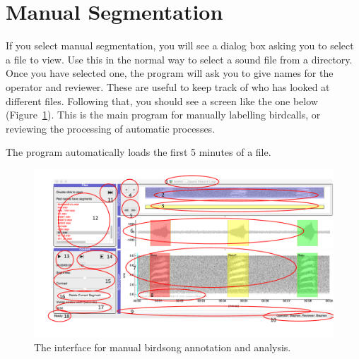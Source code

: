 \documentclass{article}
\begin{document}
\section{Manual Segmentation}
\label{sec:manual}

If you select manual segmentation, you will see a dialog box asking you to select a file to view. Use this in the normal way to select a sound file from a directory. Once you have selected one, the program will ask you to give names for the operator and reviewer. These are useful to keep track of who has looked at different files. Following that, you should see a screen like the one below (Figure~\ref{main}). This is the main program for manually labelling birdcalls, or reviewing the processing of automatic processes.

The program automatically loads the first 5 minutes of a file. 

\begin{figure}[h!]
\centering
\includegraphics[width=.8\textwidth]{Figs/AviaNZInterface.pdf}
\caption{The interface for manual birdsong annotation and analysis.}
\label{main}
\end{figure}
\end{document}
